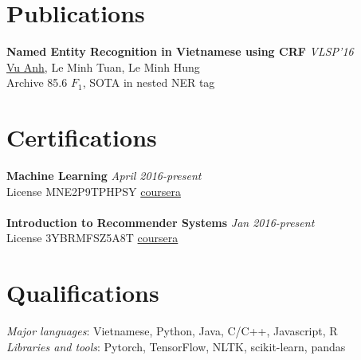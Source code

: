 \documentclass[11pt,a4paper,roman]{article}
\begin{document}
\section{Publications}

\textbf{Named Entity Recognition in Vietnamese using CRF}
\hfill
\textit{VLSP'16} \\
\underline{Vu Anh}, Le Minh Tuan, Le Minh Hung
\\
Archive 85.6 $F_{1}$, SOTA in nested NER tag

\section{Certifications}

\textbf{Machine Learning}
\hfill
\textit{April 2016-present} \\
License MNE2P9TPHPSY
\hfill
\href{https://www.coursera.org/account/accomplishments/verify/MNE2P9TPHPSY}{coursera} 
\\\\
\textbf{Introduction to Recommender Systems}
\hfill
\textit{Jan 2016-present} \\
License 3YBRMFSZ5A8T
\hfill
\href{https://www.coursera.org/account/accomplishments/verify/3YBRMFSZ5A8T}{coursera} 

\section{Qualifications}

\textit{Major languages}: Vietnamese, Python, Java, C/C++, Javascript, R
\\
\textit{Libraries and tools}: Pytorch, TensorFlow, NLTK, scikit-learn, pandas
\end{document}
